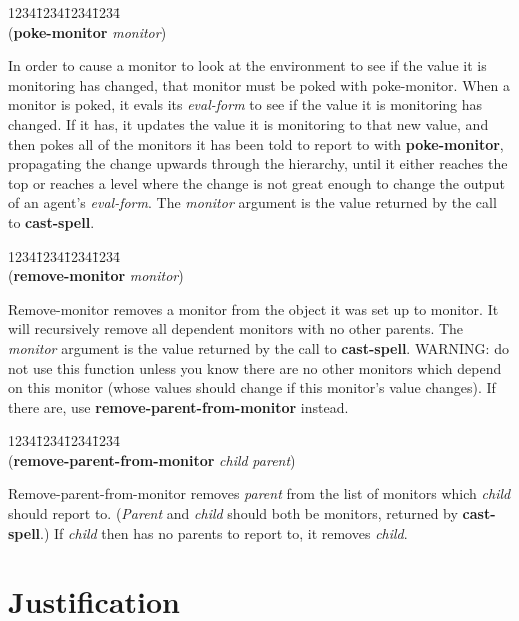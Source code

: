 \begin{tabbing}
1234\=1234\=1234\=1234\= \kill
\\
({\bf poke-monitor} {\it monitor\/}) \\
\end{tabbing}
In order to cause a monitor to look at the environment to see if the
value it is monitoring has changed, that monitor must be poked with
poke-monitor. When a monitor is poked, it evals its {\it eval-form} to
see if the value it is monitoring has changed. If it has, it updates
the value it is monitoring to that new value, and then pokes all of
the monitors it has been told to report to with {\bf poke-monitor},
propagating the change upwards through the hierarchy, until it either
reaches the top or reaches a level where the change is not great
enough to change the output of an agent's {\it eval-form}. The {\it
monitor} argument is the value returned by the call to {\bf
cast-spell}.


\begin{tabbing}
1234\=1234\=1234\=1234\= \kill
\\
({\bf remove-monitor} {\it monitor\/}) \\
\end{tabbing}
Remove-monitor removes a monitor from the object it was set up to
monitor. It will recursively remove all dependent monitors with no
other parents. The {\it monitor} argument is the value returned by the
call to {\bf cast-spell}. WARNING: do not use this function unless you
know there are no other monitors which depend on this monitor (whose
values should change if this monitor's value changes). If there are,
use {\bf remove-parent-from-monitor} instead.


\begin{tabbing}
1234\=1234\=1234\=1234\= \kill
\\
({\bf remove-parent-from-monitor} {\it child\/} {\it parent\/}) \\
\end{tabbing}
Remove-parent-from-monitor removes {\it parent} from the list of
monitors which {\it child} should report to. ({\it Parent} and {\it
child} should both be monitors, returned by {\bf cast-spell}.) If {\it
child} then has no parents to report to, it removes {\it child\/}.



\chapter{Justification}


